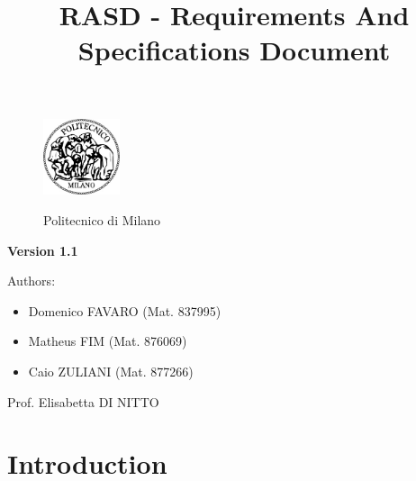 \documentclass[a4paper]{article}
\title{RASD - Requirements And Specifications Document}
\begin{document}
\begin{titlepage}
\begin{figure}
\centering
\includegraphics[width=0.2\textwidth]{polimi.jpg}
\par
\LARGE Politecnico di Milano
\end{figure}


\maketitle
\textbf{Version 1.1}
\newline

\raggedright
Authors:
\begin{itemize}
	\item Domenico FAVARO (Mat. 837995)
        	\item Matheus FIM (Mat. 876069)
	\item Caio ZULIANI (Mat. 877266)	
\end{itemize}
\raggedleft
Prof. Elisabetta DI NITTO
\thispagestyle{empty}
\end{titlepage}

\tableofcontents
\newpage
 
\section{Introduction}
\end{document}
